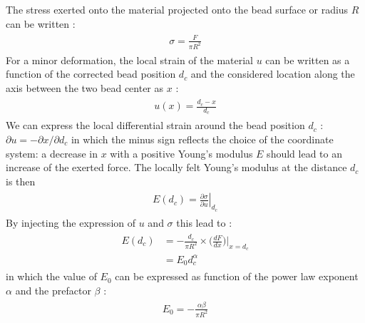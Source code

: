 \documentclass[A4paperpaper,11pt,english]{sphinxmanual}
\begin{document}
The stress exerted onto the material projected onto the bead surface or radius
\(R\) can be written :
\label{parts/part3:equation-eqa32}\begin{gather}
\begin{split}\sigma = \frac{F}{\pi R^2}\end{split}\label{parts/part3-eqa32}
\end{gather}
For a minor deformation, the local strain of the material \(u\) can be written
as a function of the corrected bead position \(d_c\) and the considered location
along the axis between the two bead center as \(x\) :
\label{parts/part3:equation-eqa33}\begin{gather}
\begin{split}u(x)= \frac{d_c-x}{d_c}\end{split}\label{parts/part3-eqa33}
\end{gather}
We can express the local differential strain around the bead position \(d_c\) : \(\partial u = -\partial x/ \partial d_c\) in which the minus sign
reflects the choice of the coordinate system: a decrease in \(x\) with a
positive Young's modulus \(E\) should lead to an increase of the exerted force.
The locally felt Young's modulus
at the distance \(d_c\) is then
\label{parts/part3:eq-e}\label{parts/part3:equation-eqa34}\begin{gather}
\begin{split}E(d_c) = \left.\frac{\partial\sigma}{\partial u}\right|_{d_c}\end{split}\label{parts/part3-eqa34}
\end{gather}
By injecting the expression of \(u\) and \(\sigma\) this lead to :
\label{parts/part3:equation-eqa35}\begin{gather}
\begin{split}E(d_c) &= -\frac{d_c}{\pi R^2}\times \Big(\frac{dF}{dx}\Big) \Big|_{x=d_c}\\
     &= E_0 d_c^\alpha\end{split}\label{parts/part3-eqa35}
\end{gather}
in which the value of \(E_0\) can be expressed as function of the power law exponent \(\alpha\) and the prefactor \(\beta\) :
\label{parts/part3:equation-eqa36}\begin{gather}
\begin{split}E_0 = - \frac{\alpha\beta}{\pi R^2}\end{split}\label{parts/part3-eqa36}
\end{gather}
\end{document}
